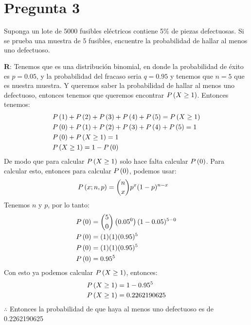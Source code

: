 
\section*{Pregunta 3}

Suponga un lote de 5000 fusibles eléctricos contiene 5\% de piezas defectuosas. Si se prueba una muestra de 5 fusibles, encuentre la probabilidad de hallar al menos uno defectuoso.

\vspace{0.3cm}
\textbf{R}: Tenemos que es una distribución binomial, en donde la probabilidad de éxito es $p = 0.05$, y la probabilidad del fracaso seria $q = 0.95$ y tenemos que $n = 5$ que es nuestra muestra. Y queremos saber la probabilidad de hallar al menos uno defectuoso, entonces tenemos que queremos encontrar ${P} \left( {X \geq 1} \right)$. Entonces tenemos:
\begin{align*}
	& {P} \left( {1} \right) + {P} \left( {2} \right) + {P} \left( {3} \right) + {P} \left( {4} \right) + {P} \left( {5} \right) = {P} \left( {X \geq 1} \right) \\
	& {P} \left( {0} \right) + {P} \left( {1} \right) + {P} \left( {2} \right) + {P} \left( {3} \right) + {P} \left( {4} \right) + {P} \left( {5} \right) = 1 \\
	& {P} \left( {0} \right) + {P} \left( {X \geq 1} \right) = 1 \\
	& {P} \left( {X \geq 1} \right) = 1 - {P} \left( {0} \right)
\end{align*}
De modo que para calcular ${P} \left( {X \geq 1} \right)$ solo hace falta calcular ${P} \left( {0} \right)$. Para calcular esto, entonces para calcular ${P} \left( {0} \right)$, podemos usar:
\begin{align*}
& {P} \left( {x; n, p} \right) = \binom{n}{x} p^x (1 - p)^{n-x}
\end{align*}
Tenemos $n$ y $p$, por lo tanto:
\begin{align*}
	& {P} \left( {0} \right) = \binom{5}{0} \left( 0.05^0 \right) (1 - 0.05)^{5-0} \\
	& {P} \left( {0} \right) = (1) (1) (0.95)^5 \\
	& {P} \left( {0} \right) = (1) (1) (0.95)^5 \\
	& {P} \left( {0} \right) = 0.95^5
\end{align*}
Con esto ya podemos calcular ${P} \left( {X \geq 1} \right)$, entonces:
\begin{align*}
	& {P} \left( {X \geq 1} \right) = 1 - 0.95^5 \\
	& {P} \left( {X \geq 1} \right) = 0.2262190625
\end{align*}
$\therefore$ Entonces la probabilidad de que haya al menos uno defectuoso es de 0.2262190625